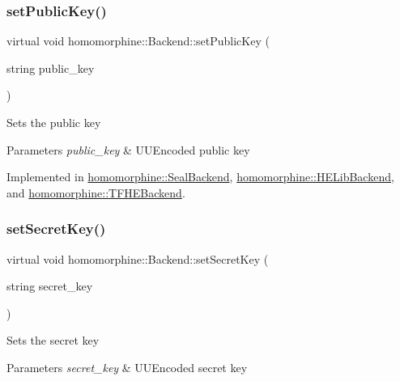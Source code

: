 \subsubsection{\texorpdfstring{setPublicKey()}{setPublicKey()}}
{\footnotesize\ttfamily virtual void homomorphine\+::\+Backend\+::set\+Public\+Key (\begin{DoxyParamCaption}\item[{string}]{public\+\_\+key }\end{DoxyParamCaption})\hspace{0.3cm}{\ttfamily [pure virtual]}}

Sets the public key


\begin{DoxyParams}{Parameters}
{\em public\+\_\+key} & U\+U\+Encoded public key \\
\hline
\end{DoxyParams}


Implemented in \mbox{\hyperlink{classhomomorphine_1_1_seal_backend_a6d34008acb06ff1d6743f9163fcd41fb}{homomorphine\+::\+Seal\+Backend}}, \mbox{\hyperlink{classhomomorphine_1_1_h_e_lib_backend_af54dc3990d99aab69c97172d0e5b4e51}{homomorphine\+::\+H\+E\+Lib\+Backend}}, and \mbox{\hyperlink{classhomomorphine_1_1_t_f_h_e_backend_a9791228603de66d1738e7c624e97c67d}{homomorphine\+::\+T\+F\+H\+E\+Backend}}.

\mbox{\label{classhomomorphine_1_1_backend_af20abcf14fae6a93c02e6470ea111123}} 
\subsubsection{\texorpdfstring{setSecretKey()}{setSecretKey()}}
{\footnotesize\ttfamily virtual void homomorphine\+::\+Backend\+::set\+Secret\+Key (\begin{DoxyParamCaption}\item[{string}]{secret\+\_\+key }\end{DoxyParamCaption})\hspace{0.3cm}{\ttfamily [pure virtual]}}

Sets the secret key


\begin{DoxyParams}{Parameters}
{\em secret\+\_\+key} & U\+U\+Encoded secret key \\
\hline
\end{DoxyParams}


